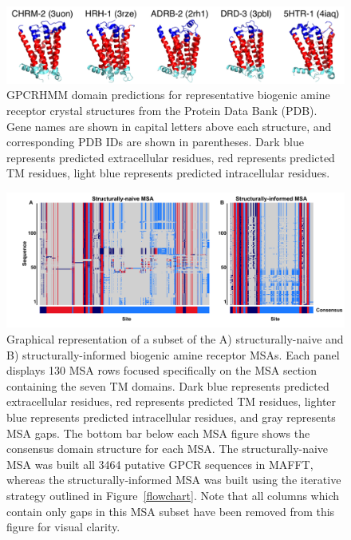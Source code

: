 \documentclass[fleqn,10pt]{wlpeerj}
\begin{document}
\newpage

\begin{figure}[htbp]
	\centerline{\includegraphics[width=15cm]{figures/pdb_gpcrhmm.pdf}}
	\caption{\label{pdb_gpcrhmm} GPCRHMM domain predictions for representative biogenic amine receptor crystal structures from the Protein Data Bank (PDB). Gene names are shown in capital letters above each structure, and corresponding PDB IDs are shown in parentheses. Dark blue represents predicted extracellular residues, red represents predicted TM residues, light blue represents predicted intracellular residues.}
\end{figure}



\vspace*{2cm}

\begin{figure}[htbp]
	\centerline{\includegraphics[width=8in]{figures/domains_naive_struc.png}}
	\caption{\label{domains} Graphical representation of a subset of the A) structurally-naive and B) structurally-informed biogenic amine receptor MSAs. Each panel displays 130 MSA rows focused specifically on the MSA section containing the seven TM domains. Dark blue represents predicted extracellular residues, red represents predicted TM residues, lighter blue represents predicted intracellular residues, and gray represents MSA gaps. The bottom bar below each MSA figure shows the consensus domain structure for each MSA. The structurally-naive MSA was built all 3464 putative GPCR sequences in MAFFT, whereas the structurally-informed MSA was built using the iterative strategy outlined in Figure~\ref{flowchart}. Note that all columns which contain only gaps in this MSA subset have been removed from this figure for visual clarity.}
\end{figure}
\end{document}
